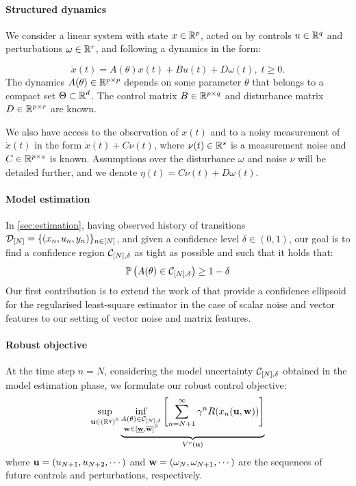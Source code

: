 \documentclass{article}
\begin{document}
\paragraph{Structured dynamics}
We consider a linear system with state $x\in\mathbb{R}^p$, acted on by controls $u\in\mathbb{R}^q$ and perturbations $\omega\in\mathbb{R}^r$, and following a dynamics in the form:

\begin{equation}
\label{eq:dynamics}
\dot{x}(t)=A(\theta)x(t) + B u(t) + D \omega(t),\;t\geq0.
\end{equation}
The dynamics $A(\theta)\in\mathbb{R}^{p\times p}$  depends on some parameter $\theta$ that belongs to a compact set $\Theta \subset \mathbb{R}^d$. The control matrix $B\in\mathbb{R}^{p\times q}$ and disturbance matrix $D\in\mathbb{R}^{p\times r}$ are known.

We also have access to the observation of $x(t)$ and to a noisy measurement of $\dot{x}(t)$ in the form $\dot{x}(t) + C\nu(t)$, where $\nu(t)\in\mathbb{R}^s$ is a measurement noise and $C\in\mathbb{R}^{p\times s}$ is known. Assumptions over the disturbance $\omega$ and noise $\nu$ will be detailed further, and we denote $\eta(t) = C\nu(t) + D\omega(t)$.

\paragraph{Model estimation}

In \autoref{sec:estimation}, having observed history of transitions $\mathcal{D}_{[N]} = \{(x_n, u_n, y_n)\}_{n\in[N]}$, and given a confidence level $\delta\in(0, 1)$, our goal is to find a confidence region $\mathcal{C}_{[N],\delta}$ as tight as possible and such that it holds that:
\begin{align}
\mathbb{P}\left(A(\theta)\in \mathcal{C}_{[N],\delta}\right) \geq 1-\delta
\label{eq:confidence}
\end{align}
Our first contribution is to extend the work of \citet{Abbasi2011} that provide a confidence ellipsoid for the regularised least-square estimator in the case of scalar noise and vector features to our setting of vector noise and matrix features.

\paragraph{Robust objective}

At the time step $n=N$, considering the model uncertainty $\mathcal{C}_{[N],\delta}$ obtained in the model estimation phase, we formulate our robust control objective:
\begin{equation}
\label{eq:robust-control}
\sup_{\mathbf{u}\in{(\mathbb{R}^q)}^{\mathbb{N}}} \underbrace{\inf_{\substack{A(\theta) \in \mathcal{C}_{[N],\delta} \\ \mathbf{w}\in[\underline{\mathbf{w}},\overline{\mathbf{w}}]^{\mathbb{N}}}} \left[\sum_{n=N+1}^\infty \gamma^n R(x_n(\mathbf{u},\mathbf{w}))\right]}_{V^r(\mathbf{u})}
\end{equation}
where $\mathbf{u} = (u_{N+1},u_{N+2},\cdots)$ and $\mathbf{w} = (\omega_N, \omega_{N+1},\cdots)$ are the sequences of future controls and perturbations, respectively.
\end{document}
